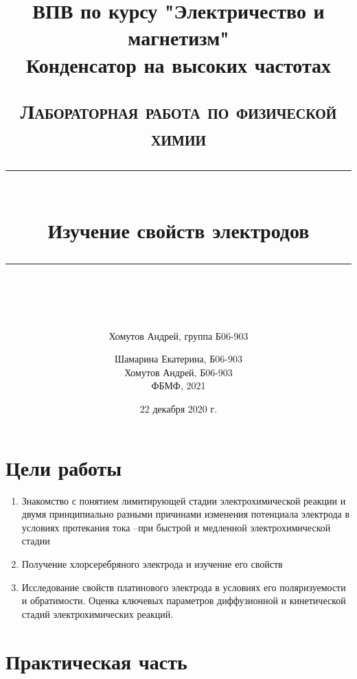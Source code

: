 \documentclass[a4paper, 12pt]{article}
\author{Хомутов Андрей, группа Б06-903}
\title{ВПВ по курсу "Электричество и магнетизм" \\ Конденсатор на высоких частотах}
\date{22 декабря 2020 г.}
\newcommand{\HRule}[1]{\rule{\linewidth}{#1}}
\begin{document}
\title{ \normalsize \textsc{Лабораторная работа по физической химии}
		\\ [4.0cm]
		\HRule{0.5pt} \\ [0.3cm]
		\LARGE \textbf{{Изучение свойств электродов}}
		\HRule{0.5pt} \\ [0.1cm]
		\normalsize  \vspace*{18\baselineskip}}

\date{}

\author{Шамарина Екатерина, Б06-903 \\
		Хомутов Андрей, Б06-903 \\
ФБМФ, 2021\\ }

\maketitle
\thispagestyle{empty}
\newpage
\section*{Цели работы} 
\begin{enumerate}
    \item Знакомство  с  понятием  лимитирующей  стадии  электрохимической  реакции  и двумя принципиально разными причинами изменения потенциала электрода в условиях протекания тока –при быстрой и медленной электрохимической стадии
    \item Получение хлорсеребряного электрода и изучение его свойств
    \item Исследование свойств платинового электрода в условиях его поляризуемости и обратимости.  Оценка  ключевых  параметров  диффузионной  и  кинетической стадий электрохимических реакций.
\end{enumerate}
 



\section{Практическая часть}
\end{document}
